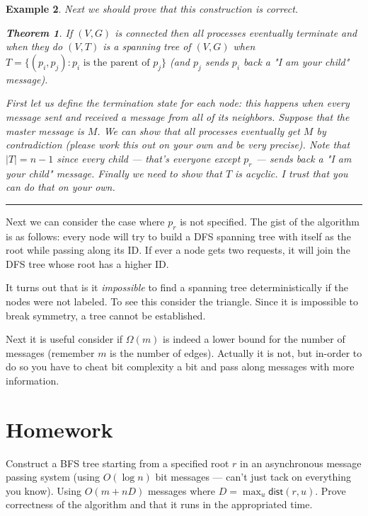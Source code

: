 \documentclass[twoside]{article}
\newcounter{lecnum}
\newtheorem{theorem}{Theorem}[lecnum]
\newtheorem{example}[theorem]{Example}
\newenvironment{proof}{{\bf Proof:}}{\hfill\rule{2mm}{2mm}}
\def\dist{\mathsf{dist}}
\begin{document}
\begin{example}
Next we should prove that this construction is correct. 
\begin{theorem}
If $(V, G)$ is connected then all processes eventually terminate and when they do $(V, T)$ is a spanning tree of $(V, G)$ when $T = \{(p_i, p_j): p_i \mbox{ is the parent of } p_j\}$ (and $p_j$ sends $p_i$ back a \emph{"I am your child"} message). 
\end{theorem}
\begin{proof}
First let us define the termination state for each node: this happens when every message sent and received a message from all of its neighbors. Suppose that the master message is $M$. We can show that all processes eventually get $M$ by contradiction (please work this out on your own and be \emph{very precise}). Note that $|T| = n-1$ since every child --- that's everyone except $p_r$ --- sends back a \emph{"I am your child"} message. Finally we need to show that $T$ is acyclic. I trust that you can do that on your own. 
\end{proof}
\end{example}

Next we can consider the case where $p_r$ is not specified. The gist of the algorithm is as follows: every node will try to build a DFS spanning tree with itself as the root while passing along its ID. If ever a node gets two requests, it will join the DFS tree whose root has a higher ID.   


It turns out that is it \emph{impossible} to find a spanning tree deterministically if the nodes were not labeled. To see this consider the triangle. Since it is impossible to break symmetry, a tree cannot be established.

Next it is useful consider if $\Omega(m)$ is indeed a lower bound for the number of messages (remember $m$ is the number of edges). Actually it is not, but in-order to do so you have to cheat bit complexity a bit and pass along messages with more information.

\section{Homework}
Construct a BFS tree starting from a specified root $r$ in an asynchronous message passing system (using $O(\log n)$ bit messages --- can't just tack on everything you know). Using $O(m + nD)$ messages where $D = \max_{u} \dist(r, u)$. Prove correctness of the algorithm and that it runs in the appropriated time. 
\end{document}

